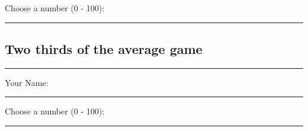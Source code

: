 \documentclass{article}
\begin{document}
\vspace{10mm}

Choose a number (0 - 100):

\vspace{3mm}

\hrule







\vspace{20mm}

\begin{center}
    \section*{Two thirds of the average game}
    \rule{0.5\textwidth}{.4pt}
\end{center}

\vspace{10mm}

Your Name:

\vspace{3mm}

\hrule

\vspace{10mm}

Choose a number (0 - 100):

\vspace{3mm}

\hrule
\end{document}
